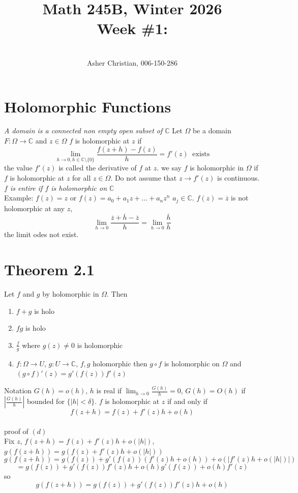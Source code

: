 \documentclass[11pt]{article}
\newcommand{\cnum}{Math 245B}
\newcommand{\ced}{Winter 2026}
\newcommand{\ctitle}[4]{\title{\vspace{-0.5in}\cnum, \ced\\Week #1: #2}\author{\vspace{-0.35in}\\#3, #4}}
\begin{document}
\ctitle{\#1}{}{Asher Christian}{006-150-286}
\date{}
\maketitle

\section{Holomorphic Functions}
\emph{A domain is a connected non empty open subset of $ \mathbb{C}$}
Let $\Omega$ be a domain $F : \Omega \rightarrow \mathbb{C}$ and $z \in \Omega$
$f$ is holomorphic at $z$ if
\[
 \lim_{h\to 0, h \in \mathbb{C} \setminus \{0\}} \frac{f(z+h) - f(z)}{h} = f'(z) \;\; \text{exists}
\] 
the value $f'(z)$ is called the derivative of  $f$ at $z$. we say $f$ is holomorphic in $\Omega$ if  $f$ 
is holomorphic at $z$ for all $z \in \Omega$. Do not assume that  $z \rightarrow f'(z)$ is continuous.
\emph{ $f$ is entire if $f$ is holomorphic on $ \mathbb{C}$ }
\\
Example: $f(z) = z$ or  $f(z) = a_0 + a_1z + \dots + a_nz^{n}$ $a_j \in \mathbb{C}$.
$f(z) = \overline{z}$ is not holomorphic at any $z$, 
\[
\lim_{h\to 0} \frac{\overline{z} + \overline{h} - \overline{z}}{h} = \lim_{h\to 0} \frac{\overline{h}}{h}
\] 
the limit odes not exist.

\section{Theorem 2.1}
Let $f$ and $g$ by holomorphic in $\Omega$. Then
 \begin{enumerate}
     \item $f + g$ is holo
     \item  $fg$ is holo
     \item  $\frac{f}{g}$ where $g(z) \ne 0$  is holomorphic
     \item $f : \Omega \rightarrow U$, $g : U \rightarrow \mathbb{C}$, $f,g$ holomorphic then  $g \circ f$ is holomorphic on  $\Omega$ and
          $(g \circ f)'(z) = g'(f(z))f'(z)$
\end{enumerate}
Notation  $G(h) = o(h)$, $h$ is real if  $\lim_{h\to 0} \frac{G(h)}{h} = 0$, $G(h) = O(h)$ if  $|\frac{G(h)}{h}|$ bounded for $\{|h| < \delta \}$.
$f$ is holomorphic at $z$ if and only if
\[
f(z+h) = f(z) +f'(z)h + o(h)
\] \\
proof of $(d)$\\
Fix $z$, $f(z + h) = f(z) + f'(z)h + o(|h|)$,  $g(f(z+h)) = g(f(z) + f'(z)h + o(|h|))$ 
\[
g(f(z+h))= g(f(z))  + g'(f(z))(f'(z)h + o(h)) + o(|f'(z)h + o(|h|)|)
\] 
\[
= g(f(z)) + g'(f(z))f'(z)h + o(h)g'(f(z)) + o(h)f'(z)
\] 
so
\[
g(f(z+h)) = g(f(z)) + g'(f(z))f'(z)h + o(h)
\] 
\end{document}
